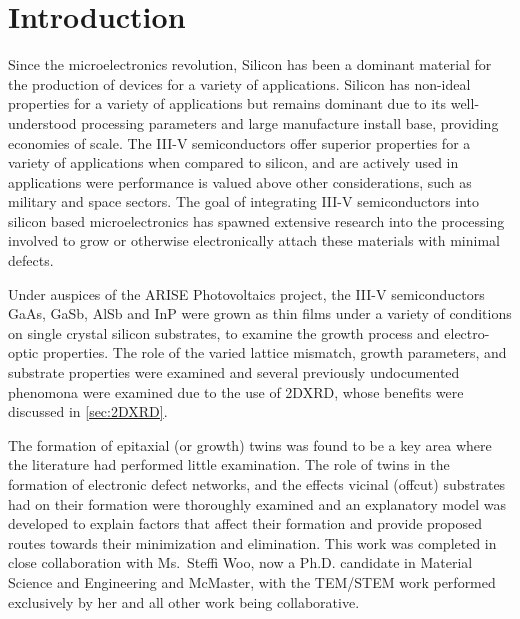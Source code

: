 \section{Introduction}
Since the microelectronics revolution, Silicon has been a dominant material for the production of devices for a variety of applications.
Silicon has non-ideal properties for a variety of applications but remains dominant due to its well-understood processing parameters and large manufacture install base, providing economies of scale.
The III-V semiconductors offer superior properties for a variety of applications when compared to silicon, and are actively used in applications were performance is valued above other considerations, such as military and space sectors.
The goal of integrating III-V semiconductors into silicon based microelectronics has spawned extensive research into the processing involved to grow or otherwise electronically attach these materials with minimal defects.

Under auspices of the ARISE Photovoltaics project, the III-V semiconductors GaAs, GaSb, AlSb and InP were grown as thin films under a variety of conditions on single crystal silicon substrates, to examine the growth process and electro-optic properties.
The role of the varied lattice mismatch, growth parameters, and substrate properties were examined and several previously undocumented phenomona were examined due to the use of 2DXRD, whose benefits were discussed in \cref{sec:2DXRD}.

The formation of epitaxial (or growth) twins was found to be a key area where the literature had performed little examination.
The role of twins in the formation of electronic defect networks, and the effects vicinal (offcut) substrates had on their formation were thoroughly examined and an explanatory model was developed to explain factors that affect their formation and provide proposed routes towards their minimization and elimination\cite{Devenyi2011}.
This work was completed in close collaboration with Ms.~Steffi Woo, now a Ph.D. candidate in Material Science and Engineering and McMaster, with the TEM/STEM work performed exclusively by her and all other work being collaborative.
